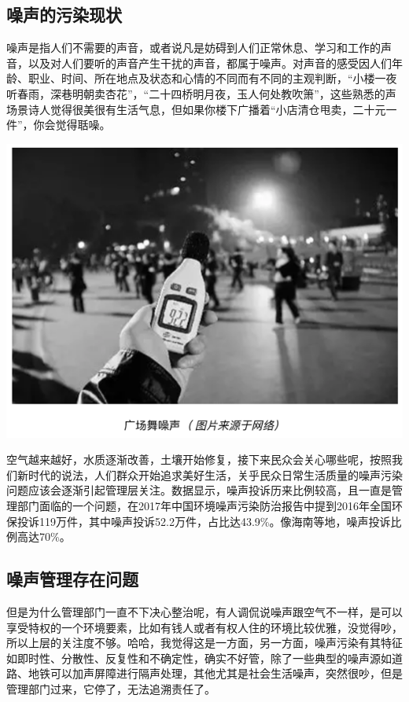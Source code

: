 \documentclass[]{book}
\begin{document}
\hypertarget{ux566aux58f0ux7684ux6c61ux67d3ux73b0ux72b6}{%
\subsection{噪声的污染现状}\label{ux566aux58f0ux7684ux6c61ux67d3ux73b0ux72b6}}

噪声是指人们不需要的声音，或者说凡是妨碍到人们正常休息、学习和工作的声音，以及对人们要听的声音产生干扰的声音，都属于噪声。对声音的感受因人们年龄、职业、时间、所在地点及状态和心情的不同而有不同的主观判断，``小楼一夜听春雨，深巷明朝卖杏花''，``二十四桥明月夜，玉人何处教吹箫''，这些熟悉的声场景诗人觉得很美很有生活气息，但如果你楼下广播着``小店清仓甩卖，二十元一件''，你会觉得聒噪。

\includegraphics[width=8.33in]{images/zaosheng1}

空气越来越好，水质逐渐改善，土壤开始修复，接下来民众会关心哪些呢，按照我们新时代的说法，人们群众开始追求美好生活，关乎民众日常生活质量的噪声污染问题应该会逐渐引起管理层关注。数据显示，噪声投诉历来比例较高，且一直是管理部门面临的一个问题，在2017年中国环境噪声污染防治报告中提到2016年全国环保投诉119万件，其中噪声投诉52.2万件，占比达43.9\%。像海南等地，噪声投诉比例高达70\%。

\hypertarget{ux566aux58f0ux7ba1ux7406ux5b58ux5728ux95eeux9898}{%
\subsection{噪声管理存在问题}\label{ux566aux58f0ux7ba1ux7406ux5b58ux5728ux95eeux9898}}

但是为什么管理部门一直不下决心整治呢，有人调侃说噪声跟空气不一样，是可以享受特权的一个环境要素，比如有钱人或者有权人住的环境比较优雅，没觉得吵，所以上层的关注度不够。哈哈，我觉得这是一方面，另一方面，噪声污染有其特征如即时性、分散性、反复性和不确定性，确实不好管，除了一些典型的噪声源如道路、地铁可以加声屏障进行隔声处理，其他尤其是社会生活噪声，突然很吵，但是管理部门过来，它停了，无法追溯责任了。
\end{document}
